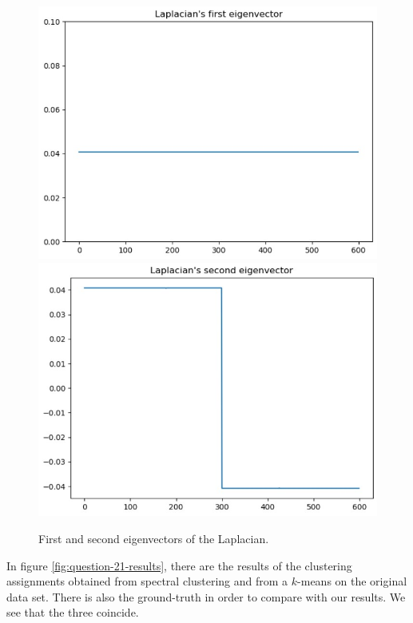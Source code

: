 \documentclass[a4paper, 11pt]{report}
\begin{document}
    \begin{figure}[!h]
        \centering
        \includegraphics[scale=0.50]{images/two_blobs_21_first_eigenvector.jpg}
        \hfill
        \includegraphics[scale=0.55]{images/two_blobs_21_second_eigenvector.jpg}
        \caption{First and second eigenvectors of the Laplacian.}
        \label{fig:two-blobs-21-eigenvectors}
    \end{figure}

    In figure \ref{fig:question-21-results}, there are the results of the clustering assignments obtained from spectral clustering and from a $k$-means on the original data set. There is also the ground-truth in order to compare with our results. We see that the three coincide.
    
\end{document}
